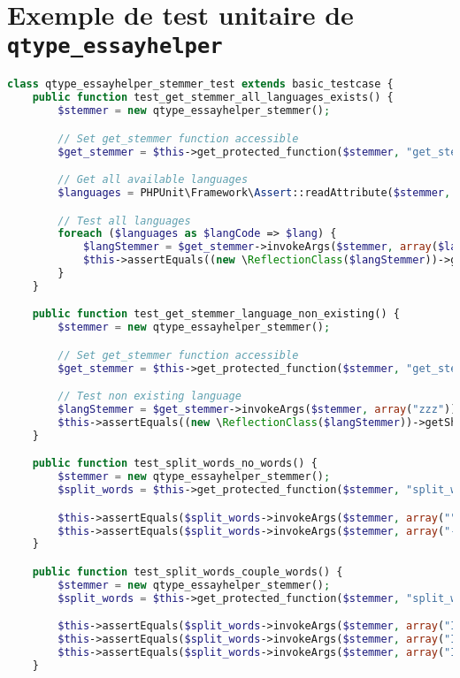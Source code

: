 \chapter{Exemple de test unitaire de \texttt{qtype\_essayhelper}}
\label{annexe_unittest}

\begin{lstlisting}[language=php,frame=l,style=default]
class qtype_essayhelper_stemmer_test extends basic_testcase {
    public function test_get_stemmer_all_languages_exists() {
        $stemmer = new qtype_essayhelper_stemmer();

        // Set get_stemmer function accessible
        $get_stemmer = $this->get_protected_function($stemmer, "get_stemmer");

        // Get all available languages
        $languages = PHPUnit\Framework\Assert::readAttribute($stemmer, "languages");

        // Test all languages
        foreach ($languages as $langCode => $lang) {
            $langStemmer = $get_stemmer->invokeArgs($stemmer, array($langCode));
            $this->assertEquals((new \ReflectionClass($langStemmer))->getShortName(), $lang);
        }
    }

    public function test_get_stemmer_language_non_existing() {
        $stemmer = new qtype_essayhelper_stemmer();

        // Set get_stemmer function accessible
        $get_stemmer = $this->get_protected_function($stemmer, "get_stemmer");

        // Test non existing language
        $langStemmer = $get_stemmer->invokeArgs($stemmer, array("zzz"));
        $this->assertEquals((new \ReflectionClass($langStemmer))->getShortName(), "English");
    }

    public function test_split_words_no_words() {
        $stemmer = new qtype_essayhelper_stemmer();
        $split_words = $this->get_protected_function($stemmer, "split_words");

        $this->assertEquals($split_words->invokeArgs($stemmer, array("")), array());
        $this->assertEquals($split_words->invokeArgs($stemmer, array("-\n    ' %")), array());
    }

    public function test_split_words_couple_words() {
        $stemmer = new qtype_essayhelper_stemmer();
        $split_words = $this->get_protected_function($stemmer, "split_words");

        $this->assertEquals($split_words->invokeArgs($stemmer, array("I love potatoes")), array("I", "love", "potatoes"));
        $this->assertEquals($split_words->invokeArgs($stemmer, array("I+love+potatoes")), array("I", "love", "potatoes"));
        $this->assertEquals($split_words->invokeArgs($stemmer, array("I-love\npotatoes")), array("I", "love", "potatoes"));
    }


\end{lstlisting}
